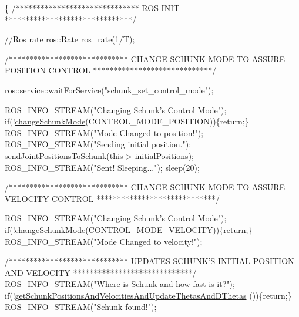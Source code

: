 \begin{DoxyCode}
                                       \{
        \textcolor{comment}{/******************************}
\textcolor{comment}{}
\textcolor{comment}{                                ROS INIT}
\textcolor{comment}{        *******************************/}

        \textcolor{comment}{//Ros rate}
        ros::Rate ros\_rate(1/\hyperlink{classCartesian__controller_a35c6ddbb9624878f2807ff644a33e832}{T});

        \textcolor{comment}{/*****************************}
\textcolor{comment}{           CHANGE SCHUNK MODE TO ASSURE POSITION CONTROL}
\textcolor{comment}{         *****************************/}

        ros::service::waitForService(\textcolor{stringliteral}{"schunk\_set\_control\_mode"});

        ROS\_INFO\_STREAM(\textcolor{stringliteral}{"Changing Schunk's Control Mode"});
        \textcolor{keywordflow}{if}(!\hyperlink{classCartesian__controller_aaf006f80e89c08cf040956afbb4cf3c0}{changeSchunkMode}(CONTROL\_MODE\_POSITION))\{\textcolor{keywordflow}{return};\}
        ROS\_INFO\_STREAM(\textcolor{stringliteral}{"Mode Changed to position!"});
        ROS\_INFO\_STREAM(\textcolor{stringliteral}{"Sending initial position."});
        \hyperlink{classCartesian__controller_ae845f67c81c2649bfbaccf95230f2599}{sendJointPositionsToSchunk}(this->
      \hyperlink{classCartesian__pose__controller_a42433d7f2e4e03ccaac56e1f9a7a5027}{initialPositions});
        ROS\_INFO\_STREAM(\textcolor{stringliteral}{"Sent! Sleeping..."});
        sleep(20);

        \textcolor{comment}{/*****************************}
\textcolor{comment}{           CHANGE SCHUNK MODE TO ASSURE VELOCITY CONTROL}
\textcolor{comment}{         *****************************/}

        ROS\_INFO\_STREAM(\textcolor{stringliteral}{"Changing Schunk's Control Mode"});
        \textcolor{keywordflow}{if}(!\hyperlink{classCartesian__controller_aaf006f80e89c08cf040956afbb4cf3c0}{changeSchunkMode}(CONTROL\_MODE\_VELOCITY))\{\textcolor{keywordflow}{return};\}
        ROS\_INFO\_STREAM(\textcolor{stringliteral}{"Mode Changed to velocity!"});

        \textcolor{comment}{/*****************************}
\textcolor{comment}{           UPDATES SCHUNK'S INITIAL POSITION AND VELOCITY}
\textcolor{comment}{         *****************************/}
        ROS\_INFO\_STREAM(\textcolor{stringliteral}{"Where is Schunk and how fast is it?"});
        \textcolor{keywordflow}{if}(!\hyperlink{classCartesian__controller_a0d7a63bac84715f6742db738df246f91}{getSchunkPositionsAndVelocitiesAndUpdateThetasAndDThetas}
      ())\{\textcolor{keywordflow}{return};\}
        ROS\_INFO\_STREAM(\textcolor{stringliteral}{"Schunk found!"});


\end{DoxyCode}
